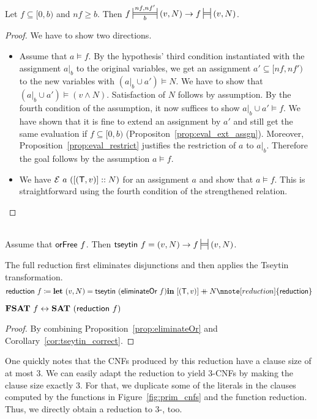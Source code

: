 \begin{proposition}
  Let $f \subseteq [0, b)$ and $nf \ge b$. 
  Then $f \Frepr{nf}{nf'}{b} (v, N) \rightarrow f \frepr{} (v, N)$. 
\end{proposition}
\begin{proof}
  We have to show two directions. 
  \begin{itemize}
    \item Assume that $a \models f$. By the hypothesis' third condition instantiated with the assignment $a|_b$ to the original variables, we get an assignment $a' \subseteq [nf, nf')$ to the new variables with $(a|_b \cup a') \models N$. We have to show that $(a|_b \cup a') \models (v \land N)$. Satisfaction of $N$ follows by assumption. By the fourth condition of the assumption, it now suffices to show $a|_b \cup a' \models f$. We have shown that it is fine to extend an assignment by $a'$ and still get the same evaluation if $f \subseteq [0, b)$ (Propositon~\ref{prop:eval_ext_assgn}).
      Moreover, Proposition~\ref{prop:eval_restrict} justifies the restriction of $a$ to $a|_b$. Therefore the goal follows by the assumption $a \models f$.
    \item We have $\mathcal{E}~a~([(\mathsf{T}, v)] :: N)$ for an assignment $a$ and show that $a \models f$. This is straightforward using the fourth condition of the strengthened relation.
  \end{itemize}
\end{proof}

\begin{corollary}\label{cor:tseytin_correct}~\\
  Assume that $\textsf{orFree}~f$. Then $\tseytin~f = (v, N) \rightarrow f \frepr{} (v, N)$. 
\end{corollary}

The full reduction first eliminates disjunctions and then applies the Tseytin transformation.
\[\textsf{reduction}~f \defeq \llet (v, N) = \tseytin~(\eliminateOr~f) \lin [(\btrue, v)] \concat N \mnote[reduction]{\textsf{reduction}}\]
\begin{lemma}
  $\textbf{FSAT}{}~f \leftrightarrow \textbf{SAT}{}~(\textsf{reduction}~f)$
\end{lemma}
\begin{proof}
  By combining Proposition~\ref{prop:eliminateOr} and Corollary~\ref{cor:tseytin_correct}.
\end{proof}

One quickly notes that the CNFs produced by this reduction have a clause size of at most 3. We can easily adapt the reduction to yield 3-CNFs by making the clause size exactly 3. For that, we duplicate some of the literals in the clauses computed by the functions in Figure~\ref{fig:prim_cnfs} and the function \textsf{reduction}.
Thus, we directly obtain a reduction to 3-\SAT{}, too.

